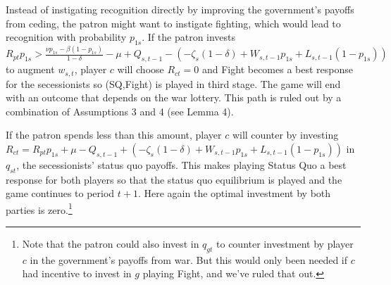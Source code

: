\documentclass[12pt]{article}
\newcommand{\de}{\delta}
\begin{document}
Instead of instigating recognition directly by improving the government's payoffs from ceding, the patron might want to instigate fighting, which would lead to recognition with probability $p_{1s}$. If the patron invests $R_{pt}p_{1s} > \frac{\nu p_{1s} - \beta (1-p_{1s})}{1 -\de} - \mu + Q_{s,t-1} - \left(-\zeta_{s}(1-\de) + W_{s,t-1}p_{1s} + L_{s,t-1}(1-p_{1s})\right)$ to augment $w_{s,t}$, player $c$ will choose $R_{ct}=0$ and Fight becomes a best response for the secessionists so (SQ,Fight) is played in third stage. The game will end with an outcome that depends on the war lottery. This path is ruled out by a combination of Assumptions 3 and 4 (see Lemma 4).

If the patron spends less than this amount, player $c$ will counter by investing $R_{ct} = R_{pt}p_{1s} + \mu - Q_{s,t-1} + \left(-\zeta_{s}(1-\de) + W_{s,t-1}p_{1s} + L_{s,t-1}(1-p_{1s})\right)$ in $q_{st}$, the secessionists' status quo payoffs. This makes playing Status Quo a best response for both players so that the status quo equilibrium is played and the game continues to period $t+1$. Here again the optimal investment by both parties is zero.\footnote{Note that the patron could also invest in $q_{gt}$ to counter investment by player $c$ in the government's payoffs from war. But this would only been needed if $c$ had incentive to invest in $g$ playing Fight, and we've ruled that out.}
\end{document}
